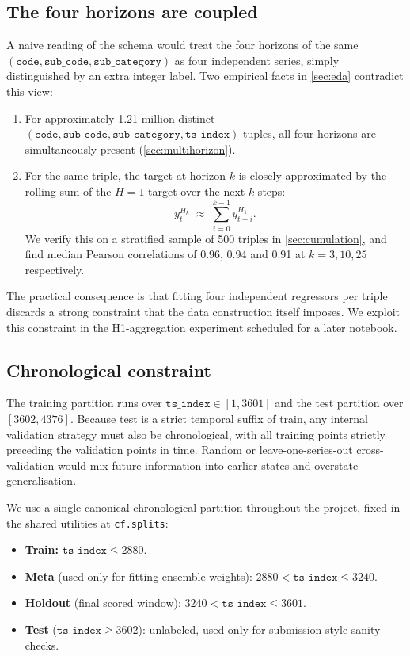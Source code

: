 \subsection{The four horizons are coupled}

A naive reading of the schema would treat the four horizons of the same $(\mathtt{code},\mathtt{sub\_code},\mathtt{sub\_category})$ as four independent series, simply distinguished by an extra integer label. Two empirical facts in \cref{sec:eda} contradict this view:

\begin{enumerate}
  \item For approximately 1.21 million distinct $(\mathtt{code},\mathtt{sub\_code},\mathtt{sub\_category},\mathtt{ts\_index})$ tuples, all four horizons are simultaneously present (\cref{sec:multihorizon}).
  \item For the same triple, the target at horizon $k$ is closely approximated by the rolling sum of the $H=1$ target over the next $k$ steps:
  \[
    y^{H_k}_t \;\approx\; \sum_{i=0}^{k-1} y^{H_1}_{t+i}.
  \]
  We verify this on a stratified sample of 500 triples in \cref{sec:cumulation}, and find median Pearson correlations of 0.96, 0.94 and 0.91 at $k=3,10,25$ respectively.
\end{enumerate}

The practical consequence is that fitting four independent regressors per triple discards a strong constraint that the data construction itself imposes. We exploit this constraint in the H1-aggregation experiment scheduled for a later notebook.

\subsection{Chronological constraint}

The training partition runs over $\mathtt{ts\_index} \in [1, 3601]$ and the test partition over $[3602, 4376]$. Because test is a strict temporal suffix of train, any internal validation strategy must also be chronological, with all training points strictly preceding the validation points in time. Random or leave-one-series-out cross-validation would mix future information into earlier states and overstate generalisation.

We use a single canonical chronological partition throughout the project, fixed in the shared utilities at \texttt{cf.splits}:

\begin{itemize}
  \item \textbf{Train:} $\mathtt{ts\_index} \le 2880$.
  \item \textbf{Meta} (used only for fitting ensemble weights): $2880 < \mathtt{ts\_index} \le 3240$.
  \item \textbf{Holdout} (final scored window): $3240 < \mathtt{ts\_index} \le 3601$.
  \item \textbf{Test} ($\mathtt{ts\_index} \ge 3602$): unlabeled, used only for submission-style sanity checks.
\end{itemize}

